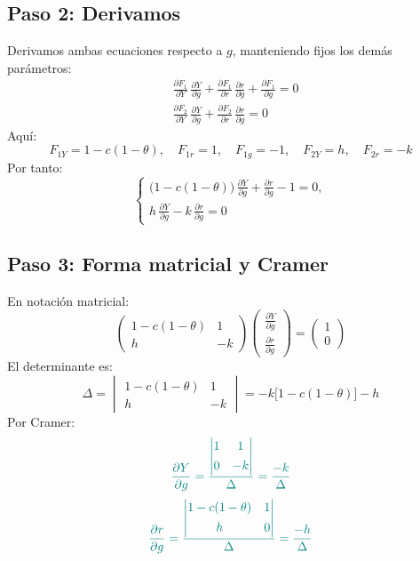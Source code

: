 \documentclass{article}
\begin{document}
\subsection*{Paso 2: Derivamos}

Derivamos ambas ecuaciones respecto a \(g\), manteniendo fijos los demás parámetros:
\[
\begin{aligned}
&\frac{\partial F_1}{\partial Y}\,\frac{\partial Y}{\partial g}
+\frac{\partial F_1}{\partial r}\,\frac{\partial r}{\partial g}
+\frac{\partial F_1}{\partial g}=0\\
&\frac{\partial F_2}{\partial Y}\,\frac{\partial Y}{\partial g}
+\frac{\partial F_2}{\partial r}\,\frac{\partial r}{\partial g}
=0
\end{aligned}
\]
Aquí:
\[
F_{1Y}=1 - c(1-\theta),\quad F_{1r}=1,\quad F_{1g}=-1,
\quad
F_{2Y}=h,\quad F_{2r}=-k
\]
Por tanto:
\[
\begin{cases}
\bigl(1 - c(1-\theta)\bigr)\,\frac{\partial Y}{\partial g}
+ \frac{\partial r}{\partial g}
-1=0,\\[4pt]
h\,\frac{\partial Y}{\partial g}
- k\,\frac{\partial r}{\partial g}
=0
\end{cases}
\]

\subsection*{Paso 3: Forma matricial y Cramer}

En notación matricial:
\[
\begin{pmatrix}
1 - c(1-\theta) & 1\\[4pt]
h               & -k
\end{pmatrix}
\begin{pmatrix}
\frac{\partial Y}{\partial g}\\[4pt]
\frac{\partial r}{\partial g}
\end{pmatrix}
=
\begin{pmatrix}
1\\[4pt]
0
\end{pmatrix}
\]
El determinante es:
\[
\Delta
=\begin{vmatrix}
1 - c(1-\theta) & 1\\[4pt]
h               & -k
\end{vmatrix}
=-k\bigl[1 - c(1-\theta)\bigr]-h
\]
Por Cramer:
\[
\color{teal}
\frac{\partial Y}{\partial g}
=\frac{
\begin{vmatrix}
1 & 1\\[4pt]
0 & -k
\end{vmatrix}
}
{\Delta}
=\frac{-k}{\Delta}
\]
\[
\color{teal}
\frac{\partial r}{\partial g}
=\frac{
\begin{vmatrix}
1 - c(1-\theta) & 1\\[4pt]
h               & 0
\end{vmatrix}
}
{\Delta}
=\frac{-h}{\Delta}
\]
\end{document}
